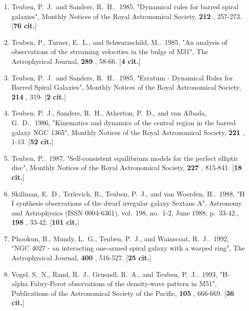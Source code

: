 \documentclass[11pt,letterpaper]{article}
\begin{document}
\begin{enumerate}[resume,label=\textbf{\arabic*}.]

\item  
Teuben, P.~J.~and Sanders, R.~H..\  1985,  "Dynamical rules for barred 
spiral galaxies", Monthly Notices of the Royal Astronomical Society,  {\bf 
212} , 257-273.  [{\bf 76 cit.}] 

\item  
Teuben, P., Turner, E.~L., and Schwarzschild, M..\  1985,  "An analysis of 
observations of the streaming velocities in the bulge of M31", The 
Astrophysical Journal,  {\bf 289} , 58-66.  [{\bf 4 cit.}] 

\item  
Teuben, P.~J.~and Sanders, R.~H..\  1985,  "Erratum - Dynamical Rules for 
Barred Spiral Galaxies", Monthly Notices of the Royal Astronomical Society,  
{\bf 214} , 319- [{\bf 2 cit.}] 

\item  
Teuben, P.~J., Sanders, R.~H., Atherton, P.~D., and van Albada, G.~D..\  
1986,  "Kinematics and dynamics of the central region in the barred galaxy 
NGC 1365", Monthly Notices of the Royal Astronomical Society,  {\bf 221} , 
1-13.  [{\bf 52 cit.}] 

\item  
Teuben, P..\  1987,  "Self-consistent equilibrium models for the perfect 
elliptic disc", Monthly Notices of the Royal Astronomical Society,  {\bf 
227} , 815-841.  [{\bf 18 cit.}] 

\item  
Skillman, E.~D., Terlevich, R., Teuben, P.~J., and van Woerden, H..\  1988,  
"H I synthesis observations of the dwarf irregular galaxy Sextans A", 
Astronomy and Astrophysics (ISSN 0004-6361), vol.~198, no.~1-2, June 1988, 
p.~33-42.,  {\bf 198} , 33-42.  [{\bf 101 cit.}] 

\item  
Phookun, B., Mundy, L.~G., Teuben, P.~J., and Wainscoat, R.~J..\  1992,  
"NGC 4027 - an interacting one-armed spiral galaxy with a warped ring", The 
Astrophysical Journal,  {\bf 400} , 516-527.  [{\bf 25 cit.}] 

\item  
Vogel, S.~N., Rand, R.~J., Gruendl, R.~A., and Teuben, P.~J..\  1993,  
"H-alpha Fabry-Perot observations of the density-wave pattern in M51", 
Publications of the Astronomical Society of the Pacific,  {\bf 105} , 
666-669.  [{\bf 36 cit.}] 



\end{enumerate}
\end{document}
